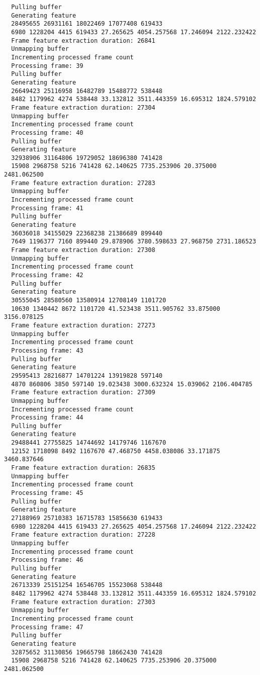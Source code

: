 \documentclass[12pt,oneside]{book}
\begin{document}
\begin{lstlisting}
  Pulling buffer
  Generating feature
  28495655 26931161 18022469 17077408 619433
  6980 1228204 4415 619433 27.265625 4054.257568 17.246094 2122.232422
  Frame feature extraction duration: 26841
  Unmapping buffer
  Incrementing processed frame count
  Processing frame: 39
  Pulling buffer
  Generating feature
  26649423 25116958 16482789 15488772 538448
  8482 1179962 4274 538448 33.132812 3511.443359 16.695312 1824.579102
  Frame feature extraction duration: 27304
  Unmapping buffer
  Incrementing processed frame count
  Processing frame: 40
  Pulling buffer
  Generating feature
  32938906 31164806 19729052 18696380 741428
  15908 2968758 5216 741428 62.140625 7735.253906 20.375000 2481.062500
  Frame feature extraction duration: 27283
  Unmapping buffer
  Incrementing processed frame count
  Processing frame: 41
  Pulling buffer
  Generating feature
  36036018 34155029 22368238 21386689 899440
  7649 1196377 7160 899440 29.878906 3780.598633 27.968750 2731.186523
  Frame feature extraction duration: 27308
  Unmapping buffer
  Incrementing processed frame count
  Processing frame: 42
  Pulling buffer
  Generating feature
  30555045 28580560 13580914 12708149 1101720
  10630 1340442 8672 1101720 41.523438 3511.905762 33.875000 3156.078125
  Frame feature extraction duration: 27273
  Unmapping buffer
  Incrementing processed frame count
  Processing frame: 43
  Pulling buffer
  Generating feature
  29595413 28216877 14701224 13919828 597140
  4870 860806 3850 597140 19.023438 3000.632324 15.039062 2106.404785
  Frame feature extraction duration: 27309
  Unmapping buffer
  Incrementing processed frame count
  Processing frame: 44
  Pulling buffer
  Generating feature
  29488441 27755825 14744692 14179746 1167670
  12152 1718098 8492 1167670 47.468750 4458.038086 33.171875 3460.837646
  Frame feature extraction duration: 26835
  Unmapping buffer
  Incrementing processed frame count
  Processing frame: 45
  Pulling buffer
  Generating feature
  27188969 25710383 16715783 15856630 619433
  6980 1228204 4415 619433 27.265625 4054.257568 17.246094 2122.232422
  Frame feature extraction duration: 27228
  Unmapping buffer
  Incrementing processed frame count
  Processing frame: 46
  Pulling buffer
  Generating feature
  26713339 25151254 16546705 15523068 538448
  8482 1179962 4274 538448 33.132812 3511.443359 16.695312 1824.579102
  Frame feature extraction duration: 27303
  Unmapping buffer
  Incrementing processed frame count
  Processing frame: 47
  Pulling buffer
  Generating feature
  32875652 31130856 19665798 18662430 741428
  15908 2968758 5216 741428 62.140625 7735.253906 20.375000 2481.062500

\end{lstlisting}
\end{document}
